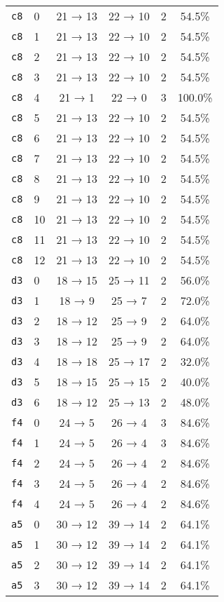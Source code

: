 \begin{tabular}{llcccc}
\texttt{c8} & 0 & 21 → 13 & 22 → 10 & 2 & 54.5\% \\
\texttt{c8} & 1 & 21 → 13 & 22 → 10 & 2 & 54.5\% \\
\texttt{c8} & 2 & 21 → 13 & 22 → 10 & 2 & 54.5\% \\
\texttt{c8} & 3 & 21 → 13 & 22 → 10 & 2 & 54.5\% \\
\texttt{c8} & 4 & 21 → 1 & 22 → 0 & 3 & 100.0\% \\
\texttt{c8} & 5 & 21 → 13 & 22 → 10 & 2 & 54.5\% \\
\texttt{c8} & 6 & 21 → 13 & 22 → 10 & 2 & 54.5\% \\
\texttt{c8} & 7 & 21 → 13 & 22 → 10 & 2 & 54.5\% \\
\texttt{c8} & 8 & 21 → 13 & 22 → 10 & 2 & 54.5\% \\
\texttt{c8} & 9 & 21 → 13 & 22 → 10 & 2 & 54.5\% \\
\texttt{c8} & 10 & 21 → 13 & 22 → 10 & 2 & 54.5\% \\
\texttt{c8} & 11 & 21 → 13 & 22 → 10 & 2 & 54.5\% \\
\texttt{c8} & 12 & 21 → 13 & 22 → 10 & 2 & 54.5\% \\
\texttt{d3} & 0 & 18 → 15 & 25 → 11 & 2 & 56.0\% \\
\texttt{d3} & 1 & 18 → 9 & 25 → 7 & 2 & 72.0\% \\
\texttt{d3} & 2 & 18 → 12 & 25 → 9 & 2 & 64.0\% \\
\texttt{d3} & 3 & 18 → 12 & 25 → 9 & 2 & 64.0\% \\
\texttt{d3} & 4 & 18 → 18 & 25 → 17 & 2 & 32.0\% \\
\texttt{d3} & 5 & 18 → 15 & 25 → 15 & 2 & 40.0\% \\
\texttt{d3} & 6 & 18 → 12 & 25 → 13 & 2 & 48.0\% \\
\texttt{f4} & 0 & 24 → 5 & 26 → 4 & 3 & 84.6\% \\
\texttt{f4} & 1 & 24 → 5 & 26 → 4 & 3 & 84.6\% \\
\texttt{f4} & 2 & 24 → 5 & 26 → 4 & 2 & 84.6\% \\
\texttt{f4} & 3 & 24 → 5 & 26 → 4 & 2 & 84.6\% \\
\texttt{f4} & 4 & 24 → 5 & 26 → 4 & 2 & 84.6\% \\
\texttt{a5} & 0 & 30 → 12 & 39 → 14 & 2 & 64.1\% \\
\texttt{a5} & 1 & 30 → 12 & 39 → 14 & 2 & 64.1\% \\
\texttt{a5} & 2 & 30 → 12 & 39 → 14 & 2 & 64.1\% \\
\texttt{a5} & 3 & 30 → 12 & 39 → 14 & 2 & 64.1\% \\

\end{tabular}
